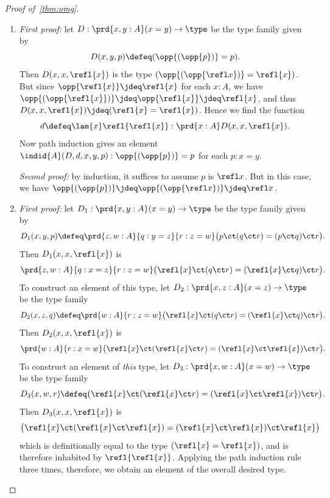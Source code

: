 \begin{proof}[Proof of~\cref{thm:omg}]
\begin{enumerate}
  \item \emph{First proof:} let $D:\prd{x,y:A} (x=y) \to \type$ be the type family given by
    \begin{equation*}
      D(x,y,p)\defeq (\opp{(\opp{p})}= p).
    \end{equation*}
    Then $D(x,x,\refl{x})$ is the type $(\opp{(\opp{\refl x})}=\refl{x})$.
    But since $\opp{\refl{x}}\jdeq \refl{x}$ for each $x:A$, we have $\opp{(\opp{\refl{x}})}\jdeq \opp{\refl{x}} \jdeq\refl{x}$, and thus $D(x,x,\refl{x})\jdeq(\refl{x}=\refl{x})$.
    Hence we find the function
    \begin{equation*}
      d\defeq\lam{x} \refl{\refl{x}}:\prd{x:A} D(x,x,\refl{x}).
    \end{equation*}
    Now path induction gives an element $\indid{A}(D,d,x,y,p):\opp{(\opp{p})}= p$ for each $p:x= y$.

    \mentalpause

    \noindent \emph{Second proof:} by induction, it suffices to assume $p$ is $\refl x$.
    But in this case, we have $\opp{(\opp{p})}\jdeq \opp{(\opp{\refl x})} \jdeq \refl x$.

  \item \emph{First proof:} let $D_1:\prd{x,y:A} (x=y) \to \type$ be the type family given by
    \begin{equation*}
      D_1(x,y,p)\defeq\prd{z,w:A}{q:y= z}{r:z= w} \big(p\ct (q\ct r)=  (p\ct q)\ct r\big).
    \end{equation*}
    Then $D_1(x,x,\refl{x})$ is
    \begin{equation*}
      \prd{z,w:A}{q:x= z}{r:z= w} \big(\refl{x}\ct(q\ct r)= (\refl{x}\ct q)\ct r\big).
    \end{equation*}
    To construct an element of this type, let $D_2:\prd{x,z:A} (x=z) \to \type$ be the type family
    \begin{equation*}
      D_2 (x,z,q) \defeq \prd{w:A}{r:z=w} \big(\refl{x}\ct(q\ct r)= (\refl{x}\ct q)\ct r\big).
    \end{equation*}
    Then $D_2(x,x,\refl{x})$ is
    \begin{equation*}
      \prd{w:A}{r:x=w} \big(\refl{x}\ct(\refl{x}\ct r)= (\refl{x}\ct \refl{x})\ct r\big).
    \end{equation*}
    To construct an element of \emph{this} type, let $D_3:\prd{x,w:A} (x=w) \to \type$ be the type family
    \begin{equation*}
      D_3(x,w,r) \defeq \big(\refl{x}\ct(\refl{x}\ct r)= (\refl{x}\ct \refl{x})\ct r\big).
    \end{equation*}
    Then $D_3(x,x,\refl{x})$ is
    \begin{equation*}
      \big(\refl{x}\ct(\refl{x}\ct \refl{x})= (\refl{x}\ct \refl{x})\ct \refl{x}\big)
    \end{equation*}
    which is definitionally equal to the type $(\refl{x} = \refl{x})$, and is therefore inhabited by $\refl{\refl{x}}$.
    Applying the path induction rule three times, therefore, we obtain an element of the overall desired type.


\end{enumerate}
\end{proof}
